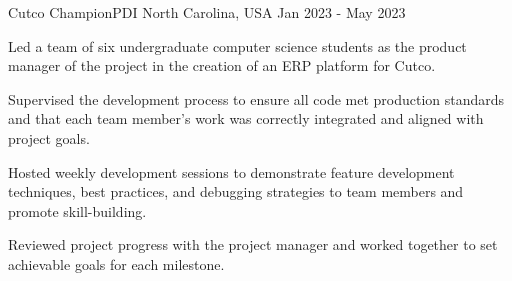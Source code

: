 

\begin{cventries}


  \cventry
    {Cutco} %
    {ChampionPDI} %
    {North Carolina, USA} %
    {Jan 2023 - May 2023} %
    {
      \begin{cvitems} %
        \item {Led a team of six undergraduate computer science students as the product manager of the project in the creation of an ERP platform for Cutco.}
        \item {Supervised the development process to ensure all code met production standards and that each team member's work was correctly integrated and aligned with project goals.}
         \item {Hosted weekly development sessions to demonstrate feature development techniques, best practices, and debugging strategies to team members and promote skill-building.}
        \item {Reviewed project progress with the project manager and worked together to set achievable goals for each milestone.}
      \end{cvitems}
    }
    

\end{cventries}
